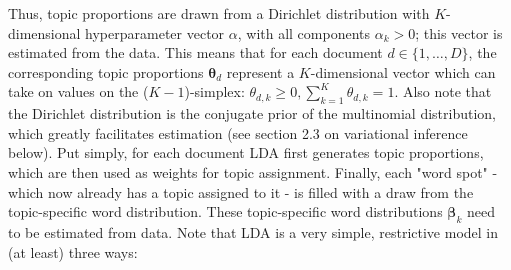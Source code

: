 \documentclass[12pt]{article}
\begin{document}
\noindent
Thus, topic proportions are drawn from a Dirichlet distribution with $K$-dimensional hyperparameter vector $\alpha$, with all components $\alpha_k > 0$; this vector is estimated from the data. This means that for each document $d \in \{1,\dots,D\}$, the corresponding topic proportions $\boldsymbol{\theta}_d$ represent a $K$-dimensional vector which can take on values on the ($K-1$)-simplex: $\theta_{d,k} \geq 0, \sum_{k=1}^{K}\theta_{d,k}=1$. Also note that the Dirichlet distribution is the conjugate prior of the multinomial distribution, which greatly facilitates estimation (see section 2.3 on variational inference below). Put simply, for each document LDA first generates topic proportions, which are then used as weights for topic assignment. Finally, each "word spot" - which now already has a topic assigned to it - is filled with a draw from the topic-specific word distribution. These topic-specific word distributions $\boldsymbol{\beta}_k$ need to be estimated from data.
Note that LDA is a very simple, restrictive model in (at least) three ways:
\end{document}
